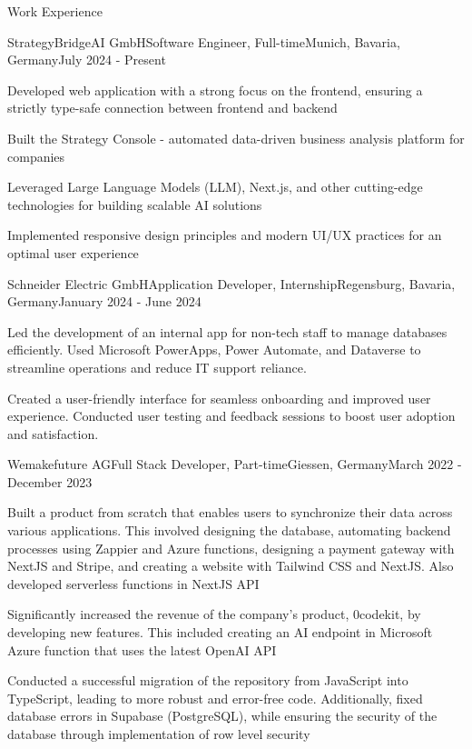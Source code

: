 \documentclass{article}
\newlength{\tabin}
\newlength{\secsep}
\newcommand{\lineunder}{\vspace*{-6pt} \\ \hspace*{-6pt} \hrulefill \\ \vspace*{-15pt}}
\newenvironment{tabbedsection}[1]{
  \begin{list}{}{
      \setlength{\itemsep}{0pt}
      \setlength{\labelsep}{0pt}
      \setlength{\labelwidth}{0pt}
      \setlength{\leftmargin}{\tabin}
      \setlength{\rightmargin}{\tabin}
      \setlength{\listparindent}{0pt}
      \setlength{\parsep}{0pt}
      \setlength{\parskip}{0pt}
      \setlength{\partopsep}{0pt}
      \setlength{\topsep}{#1}
    }
  \item[]
}{\end{list}}
\newenvironment{resume_section}[1]{
  \vspace{1.5\secsep}
  \textsc{\large#1}
  \lineunder
  \begin{tabbedsection}{\secsep}
}{\end{tabbedsection}}
\newenvironment{subitems}{
  \renewcommand{\labelitemi}{-}
  \begin{itemize}
      \setlength{\labelsep}{1em}
}{\end{itemize}}
\newenvironment{resume_employer}[4]{
  \vspace{\secsep}
  \textbf{#1} \\ 
  \indent {\small #2} \hfill {\footnotesize#3 (#4)}
  \begin{tabbedsection}{0pt}
  \begin{subitems}
}{\end{subitems}\end{tabbedsection}}
\begin{document}
    \begin{resume_section}{Work Experience}

    \begin{resume_employer}{StrategyBridgeAI GmbH}{Software Engineer, Full-time}{Munich, Bavaria, Germany}{July 2024 - Present}
        \item Developed web application with a strong focus on the frontend, ensuring a strictly type-safe connection between frontend and backend
        \item Built the Strategy Console - automated data-driven business analysis platform for companies
        \item Leveraged Large Language Models (LLM), Next.js, and other cutting-edge technologies for building scalable AI solutions
        \item Implemented responsive design principles and modern UI/UX practices for an optimal user experience
      \end{resume_employer}

    \begin{resume_employer}{Schneider Electric GmbH}{Application Developer, Internship}{Regensburg, Bavaria, Germany}{January 2024 - June 2024}
    \item Led the development of an internal app for non-tech staff to manage databases efficiently. Used Microsoft PowerApps, Power Automate, and Dataverse to streamline operations and reduce IT support reliance.
    
    \item Created a user-friendly interface for seamless onboarding and improved user experience. Conducted user testing and feedback sessions to boost user adoption and satisfaction.
\end{resume_employer}
      
      \begin{resume_employer}{Wemakefuture AG}{Full Stack Developer, Part-time}{Giessen, Germany}{March 2022 - December 2023}
        \item Built a product from scratch that enables users to synchronize their data across various applications. This involved designing the database, automating backend processes using Zappier and Azure functions, designing a payment gateway with NextJS and Stripe, and creating a website with Tailwind CSS and NextJS. Also developed serverless functions in NextJS API
        \item Significantly increased the revenue of the company's product, 0codekit, by developing new features. This included creating an AI endpoint in Microsoft Azure function that uses the latest OpenAI API
        \item Conducted a successful migration of the repository from JavaScript into TypeScript, leading to more robust and error-free code. Additionally, fixed database errors in Supabase (PostgreSQL), while ensuring the security of the database through implementation of row level security
      \end{resume_employer}


\end{resume_section}
\end{document}
